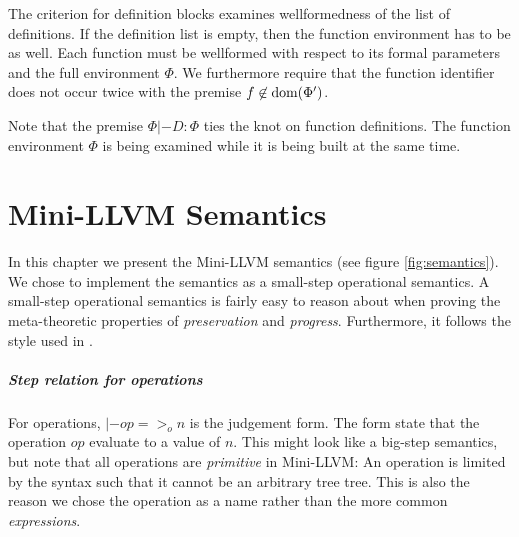 \documentclass[a4paper, oneside, 10pt, draft]{memoir}
\begin{document}
The criterion for definition blocks examines wellformedness of the
list of definitions. If the definition list is empty, then the
function environment has to be as well. Each function must be
wellformed with respect to its formal parameters and the full
environment $\Phi$. We furthermore require that the function identifier
does not occur twice with the premise $f \not \in \mathrm{dom}(\Phi')$.

Note that the premise $\Phi |- D : \Phi$ ties the knot on function
definitions. The function environment $\Phi$ is being examined while it
is being built at the same time.



\chapter{Mini-LLVM Semantics}

In this chapter we present the Mini-LLVM semantics (see figure
\ref{fig:semantics}). We chose to implement the semantics as a
small-step operational semantics. A small-step operational semantics
is fairly easy to reason about when proving the meta-theoretic
properties of \emph{preservation} and \emph{progress}. Furthermore, it
follows the style used in \cite{pierce:2002:types}.

\paragraph{Step relation for operations}

\newcommand{\eop}{=>_{o}} For operations, $\boxed{|- op \eop n}$ is
the judgement form. The form state that the operation $op$ evaluate to a
value of $n$. This might look like a big-step semantics, but note that
all operations are \emph{primitive} in Mini-LLVM: An operation is
limited by the syntax such that it cannot be an arbitrary tree
tree. This is also the reason we chose the operation as a name rather
than the more common \emph{expressions}.
\end{document}
